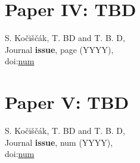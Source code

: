 \documentclass[11pt,twoside,openright]{book}
\begin{document}
\chapter{Paper IV: TBD}
S. Ko{\v{c}}i{\v{s}}{\v{c}}{\'a}k, T. BD and T. B. D,\\
Journal {\bf issue}, page (YYYY),\\
doi:\href{https://doi.org/num}{num}
\newpage\null\newpage
% 


\chapter{Paper V: TBD}
S. Ko{\v{c}}i{\v{s}}{\v{c}}{\'a}k, T. BD and T. B. D,\\
Journal {\bf issue}, num (YYYY),\\
doi:\href{https://doi.org/num}{num}
\newpage\null\newpage
% 
\end{document}
